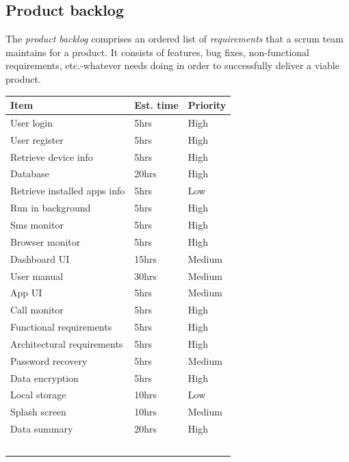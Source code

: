 \documentclass[hidelinks, 12pt, oneside]{article}
\begin{document}
 	\subsection{Product backlog}
 	The \emph{product backlog} comprises an ordered list of \emph{requirements} that a scrum team maintains for a product. It consists of features, bug fixes, non-functional 
 	requirements, etc.-whatever needs doing in order to successfully deliver a viable product.\newline\newline 	
 	\begin{tabular}{|p{6cm}|p{4cm}|p{3cm}|}
			\textbf{Item} & \textbf{Est. time} & \textbf{Priority}\\
			\hline
			User login & 5hrs & High\\
			\hline
			User register & 5hrs & High\\
			\hline
			Retrieve device info & 5hrs & High\\
			\hline
			Database & 20hrs & High\\
			\hline
			Retrieve installed apps info & 5hrs & Low\\
			\hline
			Run in background & 5hrs & High\\
			\hline
			Sms monitor & 5hrs & High\\
			\hline
			Browser monitor & 5hrs & High\\
			\hline
			Dashboard UI & 15hrs & Medium\\
			\hline
			User manual & 30hrs & Medium\\
			\hline
			App UI & 5hrs & Medium\\
			\hline
			Call monitor & 5hrs & High\\
			\hline
			Functional requirements & 5hrs & High\\
			\hline
			Architectural requirements & 5hrs & High\\
			\hline
			Password recovery & 5hrs & Medium\\
			\hline
			Data encryption & 5hrs & High\\
			\hline
			Local storage & 10hrs & Low\\
			\hline
			Splash screen & 10hrs & Medium\\
			\hline
			Data summary & 20hrs & High\\
			\hline
			&&\\
			\hline
			&&\\
			\hline
			&&\\
			\hline
			&&\\
			\hline
			&&\\
			\hline
		\end{tabular}\newpage
		
\end{document}
